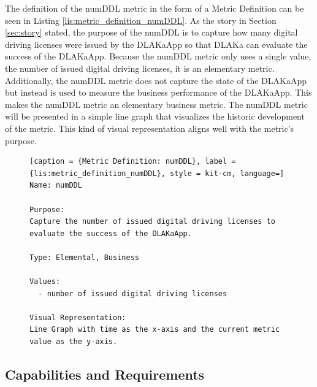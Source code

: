 The definition of the numDDL metric in the form of a
Metric Definition can be seen in Listing \ref{lis:metric_definition_numDDL}.
As the story in Section \ref{sec:story} stated, the purpose of the numDDL is to capture how many
digital driving licenses were issued by the DLAKaApp so that DLAKa can evaluate
the success of the DLAKaApp. Because the numDDL metric only uses a single value,
the number of issued digital driving licenses, it is an elementary metric.
Additionally, the numDDL metric does not capture the state of the DLAKaApp
but instead is used to measure the business performance of the DLAKaApp.
This makes the numDDL metric an elementary business metric.
The numDDL metric will be presented in a simple line graph that visualizes
the historic development of the metric. This kind of visual representation
aligns well with the metric's purpose.

\begin{figure}[tb]
\begin{lstlisting}[caption = {Metric Definition: numDDL}, label = {lis:metric_definition_numDDL}, style = kit-cm, language=]
Name: numDDL

Purpose:
Capture the number of issued digital driving licenses to
evaluate the success of the DLAKaApp.

Type: Elemental, Business

Values:
  - number of issued digital driving licenses

Visual Representation:
Line Graph with time as the x-axis and the current metric value as the y-axis.
\end{lstlisting}
\end{figure}



\subsection{Capabilities and Requirements}

